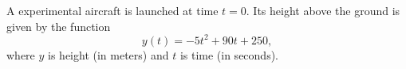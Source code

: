 \documentclass[addpoints, 12pt]{exam}
\begin{document}
\begin{questions}

\newpage 

\question[10]
A experimental aircraft is launched at time $t=0$.  Its height above the ground is given by the function \begin{equation*}
	y(t) = -5t^2 + 90t + 250 ,
\end{equation*}
where $y$ is height (in meters) and $t$ is time (in seconds).

\end{questions}
\end{document}
